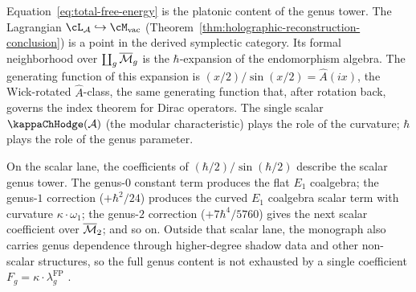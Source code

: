 \begin{remark}%
\label{rem:ahat-platonic}%
%
Equation~\eqref{eq:total-free-energy} is the platonic
content of the genus tower. The Lagrangian
$\cL_\cA \hookrightarrow \Mvac$
(Theorem~\ref{thm:holographic-reconstruction-conclusion})
is a point in the derived symplectic category. Its formal
neighborhood over $\coprod_g \overline{\mathcal{M}}_g$ is the
$\hbar$-expansion of the endomorphism algebra. The
generating function of this expansion is
$(x/2)/\sin(x/2) = \hat{A}(ix)$, the Wick-rotated
$\hat{A}$-class, the same generating function that,
after rotation back, governs the index theorem for
Dirac operators. The single scalar $\kappaChHodge(\cA)$ (the
modular characteristic) plays the role of the curvature;
$\hbar$ plays the role of the genus parameter.

On the scalar lane, the coefficients of
$(\hbar/2)/\sin(\hbar/2)$ describe the scalar genus tower.
The genus-$0$ constant term produces the flat $E_1$
coalgebra; the genus-$1$ correction ($+\hbar^2/24$) produces
the curved $E_1$ coalgebra scalar term with curvature
$\kappa \cdot \omega_1$; the genus-$2$ correction
($+7\hbar^4/5760$) gives the next scalar coefficient over
$\overline{\mathcal{M}}_2$; and so on. Outside that scalar lane, the
monograph also carries genus dependence through
higher-degree shadow data and other non-scalar structures,
so the full genus content is not exhausted by a single
coefficient $F_g = \kappa \cdot \lambda_g^{\mathrm{FP}}$ .
\end{remark}

